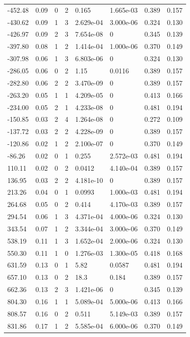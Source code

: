 \documentclass[preview]{standalone}
\begin{document}
{{\begin{tabular}{L{1.2cm}C{1.2cm} C{0.3cm}C{0.5cm} C{1.4cm}C{1.4cm} C{1.4cm}C{1.4cm}}
  -452.48  &  0.09  & 0     &  2 &  0.165  & 1.665e-03  & 0.389 &  0.157   \\ 
  -430.62  &  0.09  & 1     &  3 &  2.629e-04  & 3.000e-06  & 0.324 &  0.130   \\ 
  -426.97  &  0.09  & 2     &  3 &  7.654e-08  & 0  & 0.345 &  0.139   \\ 
  -397.80  &  0.08  & 1     &  2 &  1.414e-04  & 1.000e-06  & 0.370 &  0.149   \\ 
  -307.98  &  0.06  & 1     &  3 &  6.803e-06  & 0  & 0.324 &  0.130   \\ 
  -286.05  &  0.06  & 0     &  2 &  1.15  & 0.0116  & 0.389 &  0.157   \\ 
  -282.80  &  0.06  & 2     &  2 &  3.470e-09  & 0  & 0.389 &  0.157   \\ 
  -263.20  &  0.05  & 1     &  1 &  4.209e-05  & 0  & 0.413 &  0.166   \\ 
  -234.00  &  0.05  & 2     &  1 &  4.233e-08  & 0  & 0.481 &  0.194   \\ 
  -150.85  &  0.03  & 2     &  4 &  1.264e-08  & 0  & 0.272 &  0.109   \\ 
  -137.72  &  0.03  & 2     &  2 &  4.228e-09  & 0  & 0.389 &  0.157   \\ 
  -120.86  &  0.02  & 1     &  2 &  2.100e-07  & 0  & 0.370 &  0.149   \\ 
  -86.26  &  0.02  & 0     &  1 &  0.255  & 2.572e-03  & 0.481 &  0.194   \\ 
  110.11  &  0.02  & 0     &  2 &  0.0412  & 4.140e-04  & 0.389 &  0.157   \\ 
  136.95  &  0.03  & 2     &  2 &  4.181e-10  & 0  & 0.389 &  0.157   \\ 
  213.26  &  0.04  & 0     &  1 &  0.0993  & 1.000e-03  & 0.481 &  0.194   \\ 
  264.68  &  0.05  & 0     &  2 &  0.414  & 4.170e-03  & 0.389 &  0.157   \\ 
  294.54  &  0.06  & 1     &  3 &  4.371e-04  & 4.000e-06  & 0.324 &  0.130   \\ 
  343.54  &  0.07  & 1     &  2 &  3.344e-04  & 3.000e-06  & 0.370 &  0.149   \\ 
  538.19  &  0.11  & 1     &  3 &  1.652e-04  & 2.000e-06  & 0.324 &  0.130   \\ 
  550.30  &  0.11  & 1     &  0 &  1.276e-03  & 1.300e-05  & 0.418 &  0.168   \\ 
  631.59  &  0.13  & 0     &  1 &  5.82  & 0.0587  & 0.481 &  0.194   \\ 
  657.10  &  0.13  & 0     &  2 &  18.3  & 0.184  & 0.389 &  0.157   \\ 
  662.36  &  0.13  & 2     &  3 &  1.421e-06  & 0  & 0.345 &  0.139   \\ 
  804.30  &  0.16  & 1     &  1 &  5.089e-04  & 5.000e-06  & 0.413 &  0.166   \\ 
  808.57  &  0.16  & 0     &  2 &  0.511  & 5.149e-03  & 0.389 &  0.157   \\ 
  831.86  &  0.17  & 1     &  2 &  5.585e-04  & 6.000e-06  & 0.370 &  0.149   \\ 
\hline 
\end{tabular} 

}}
\end{document}
